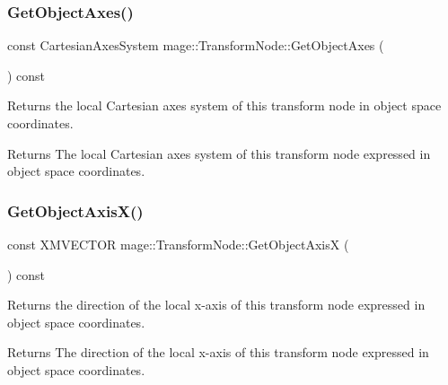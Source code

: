 \hypertarget{classmage_1_1_transform_node_aa6d5feb41f6e6d1582d26721ba537fdb}{}\label{classmage_1_1_transform_node_aa6d5feb41f6e6d1582d26721ba537fdb} 
\subsubsection{\texorpdfstring{Get\+Object\+Axes()}{GetObjectAxes()}}
{\footnotesize\ttfamily const Cartesian\+Axes\+System mage\+::\+Transform\+Node\+::\+Get\+Object\+Axes (\begin{DoxyParamCaption}{ }\end{DoxyParamCaption}) const}

Returns the local Cartesian axes system of this transform node in object space coordinates.

\begin{DoxyReturn}{Returns}
The local Cartesian axes system of this transform node expressed in object space coordinates. 
\end{DoxyReturn}
\hypertarget{classmage_1_1_transform_node_a6a6375218a90d18163aeec59d91a68e2}{}\label{classmage_1_1_transform_node_a6a6375218a90d18163aeec59d91a68e2} 
\subsubsection{\texorpdfstring{Get\+Object\+Axis\+X()}{GetObjectAxisX()}}
{\footnotesize\ttfamily const X\+M\+V\+E\+C\+T\+OR mage\+::\+Transform\+Node\+::\+Get\+Object\+AxisX (\begin{DoxyParamCaption}{ }\end{DoxyParamCaption}) const}

Returns the direction of the local x-\/axis of this transform node expressed in object space coordinates.

\begin{DoxyReturn}{Returns}
The direction of the local x-\/axis of this transform node expressed in object space coordinates. 
\end{DoxyReturn}
\hypertarget{classmage_1_1_transform_node_a807df3821f17d6b7ce1f7ca5a56b552d}{}\label{classmage_1_1_transform_node_a807df3821f17d6b7ce1f7ca5a56b552d} 

